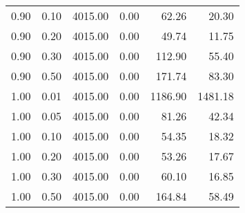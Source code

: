 \begin{table}
\begin{tabular}{rrrrrr}
0.90 & 0.10 & 4015.00 & 0.00 & 62.26 & 20.30 \\
0.90 & 0.20 & 4015.00 & 0.00 & 49.74 & 11.75 \\
0.90 & 0.30 & 4015.00 & 0.00 & 112.90 & 55.40 \\
0.90 & 0.50 & 4015.00 & 0.00 & 171.74 & 83.30 \\
1.00 & 0.01 & 4015.00 & 0.00 & 1186.90 & 1481.18 \\
1.00 & 0.05 & 4015.00 & 0.00 & 81.26 & 42.34 \\
1.00 & 0.10 & 4015.00 & 0.00 & 54.35 & 18.32 \\
1.00 & 0.20 & 4015.00 & 0.00 & 53.26 & 17.67 \\
1.00 & 0.30 & 4015.00 & 0.00 & 60.10 & 16.85 \\
1.00 & 0.50 & 4015.00 & 0.00 & 164.84 & 58.49 \\
\bottomrule
\end{tabular}
\end{table}
